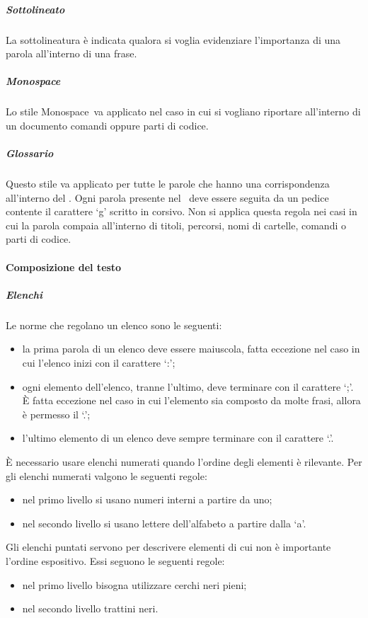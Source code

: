 \documentclass[../NormeProgetto.text]{subfiles}
\begin{document}
			\subparagraph{Sottolineato}
				La sottolineatura è indicata qualora si voglia evidenziare l'importanza di una parola all'interno di una frase.					
			
			\subparagraph{Monospace}
				Lo stile Monospace\g\ va applicato nel caso in cui si vogliano riportare all'interno di un documento	comandi oppure parti di codice.
			
			\subparagraph{Glossario}\label{sec:Formattazione termini nel glossario}
				Questo stile va applicato per tutte le parole che hanno una corrispondenza all'interno del \glossario. Ogni parola presente nel \glossario\ deve essere seguita da un pedice contente il carattere `g' scritto in corsivo. Non si applica questa regola nei casi in cui la parola compaia all'interno di titoli, percorsi, nomi di cartelle, comandi o parti di codice.
			
		\paragraph{Composizione del testo}
			\subparagraph{Elenchi}
				Le norme che regolano un elenco sono le seguenti:
				\begin{itemize}
					\item la prima parola di un elenco deve essere maiuscola, fatta eccezione nel caso in cui l'elenco inizi con il carattere `:';
					\item ogni elemento dell'elenco, tranne l'ultimo, deve terminare con il carattere `;'. È fatta eccezione nel caso in cui l'elemento sia composto da molte frasi, allora è permesso il `.';
					\item l'ultimo elemento di un elenco deve sempre terminare con il carattere `.'.
				\end{itemize}
				È necessario usare elenchi numerati quando l'ordine degli elementi è rilevante. Per gli elenchi numerati valgono le seguenti regole:
				\begin{itemize}
					\item nel primo livello si usano numeri interni a partire da uno;
					\item nel secondo livello si usano lettere dell'alfabeto a partire dalla `a'.
				\end{itemize}
				Gli elenchi puntati servono per descrivere elementi di cui non è importante l'ordine espositivo. Essi seguono le seguenti regole:
				\begin{itemize}
					\item nel primo livello bisogna utilizzare cerchi neri pieni;
					\item nel secondo livello trattini neri.
				\end{itemize}
			
\end{document}
